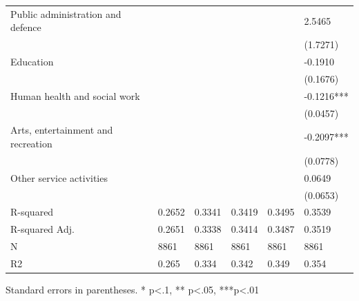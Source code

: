 \begin{table}
\begin{center}
\begin{tabular}{llllll}
Public administration and defence &             &            &              &                 & 2.5465            \\
                                     &             &            &              &                 & (1.7271)          \\
Education &             &            &              &                 & -0.1910           \\
                                     &             &            &              &                 & (0.1676)          \\
Human health and social work &             &            &              &                 & -0.1216***        \\
                                     &             &            &              &                 & (0.0457)          \\
Arts, entertainment and recreation &             &            &              &                 & -0.2097***        \\
                                     &             &            &              &                 & (0.0778)          \\
Other service activities &             &            &              &                 & 0.0649            \\
                                     &             &            &              &                 & (0.0653)          \\
R-squared                            & 0.2652      & 0.3341     & 0.3419       & 0.3495          & 0.3539            \\
R-squared Adj.                       & 0.2651      & 0.3338     & 0.3414       & 0.3487          & 0.3519            \\
N                                    & 8861        & 8861       & 8861         & 8861            & 8861              \\
R2                                   & 0.265       & 0.334      & 0.342        & 0.349           & 0.354             \\
\hline
\end{tabular}
\end{center}
\end{table}
\bigskip
Standard errors in parentheses. \newline 
* p<.1, ** p<.05, ***p<.01